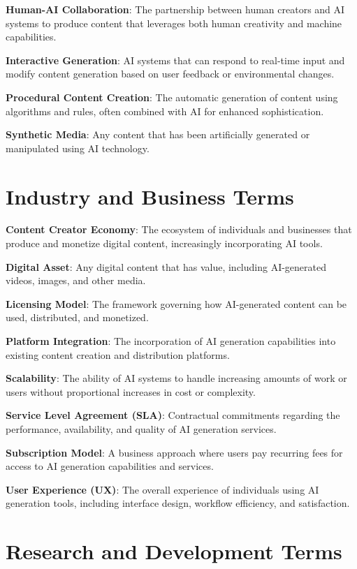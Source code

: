 \textbf{Human-AI Collaboration}: The partnership between human creators and AI systems to produce content that leverages both human creativity and machine capabilities.

\textbf{Interactive Generation}: AI systems that can respond to real-time input and modify content generation based on user feedback or environmental changes.

\textbf{Procedural Content Creation}: The automatic generation of content using algorithms and rules, often combined with AI for enhanced sophistication.

\textbf{Synthetic Media}: Any content that has been artificially generated or manipulated using AI technology.

\section{Industry and Business Terms}

\textbf{Content Creator Economy}: The ecosystem of individuals and businesses that produce and monetize digital content, increasingly incorporating AI tools.

\textbf{Digital Asset}: Any digital content that has value, including AI-generated videos, images, and other media.

\textbf{Licensing Model}: The framework governing how AI-generated content can be used, distributed, and monetized.

\textbf{Platform Integration}: The incorporation of AI generation capabilities into existing content creation and distribution platforms.

\textbf{Scalability}: The ability of AI systems to handle increasing amounts of work or users without proportional increases in cost or complexity.

\textbf{Service Level Agreement (SLA)}: Contractual commitments regarding the performance, availability, and quality of AI generation services.

\textbf{Subscription Model}: A business approach where users pay recurring fees for access to AI generation capabilities and services.

\textbf{User Experience (UX)}: The overall experience of individuals using AI generation tools, including interface design, workflow efficiency, and satisfaction.

\section{Research and Development Terms}


